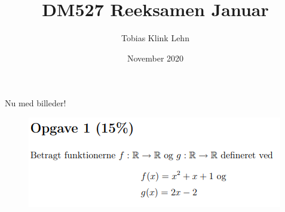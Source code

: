 \documentclass{article}
\title{DM527 Reeksamen Januar}
\author{Tobias Klink Lehn}
\date{November 2020}
\begin{document}
Nu med billeder!
\begin{figure}[h]
\begin{center}
\includegraphics[scale=1]{Opgave1Formulering}
\end{center}
\end{figure}
\end{document}
